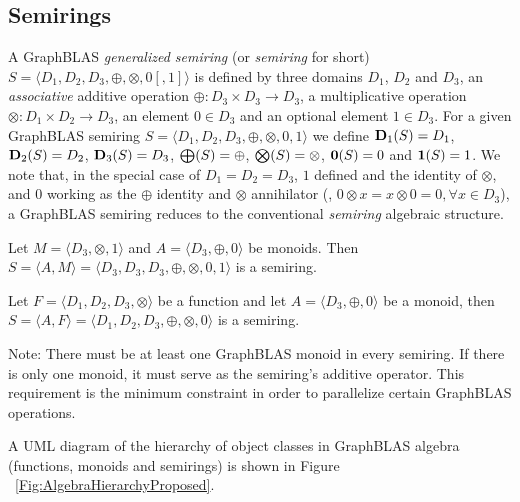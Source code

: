 \documentclass[11pt]{extarticle}
\begin{document}
\subsection{Semirings}

A GraphBLAS \emph{generalized semiring} (or \emph{semiring} for short)
$S=\langle D_1,D_2,D_3,\oplus,\otimes,0 [,1] \rangle$ is defined by
three domains $D_1$, $D_2$ and $D_3$, an \emph{associative} additive operation $\oplus :
D_3 \times D_3 \rightarrow D_3$, 
a multiplicative operation $\otimes : D_1 \times D_2 \rightarrow
D_3$, an element $0 \in D_3$ and an optional element $1 \in D_3$.
For a given GraphBLAS semiring $S=\langle D_1,
D_2, D_3,\oplus,\otimes,0,1 \rangle$ we define $\bold{D}_1(S) = D_1$,
$\bold{D}_2(S) = D_2$, $\bold{D}_3(S) = D_3$, $\bold{\bigoplus}(S) =
\oplus$, $\bold{\bigotimes}(S) = \otimes$, ${\bf 0}(S) = 0$ and ${\bf 1}(S) =
1$. We note that, in the special case of $D_1 = D_2 = D_3$, $1$ defined and the identity of $\otimes$,
and $0$ working as the $\oplus$ identity and $\otimes$ annihilator (\ie, $0 \otimes x = x
\otimes 0 = 0, \forall x \in D_3$), a GraphBLAS semiring reduces to the
conventional \emph{semiring} algebraic structure.

Let $M = \langle D_3, \otimes,1 \rangle$ and $A = \langle D_3,\oplus,0 \rangle$ be monoids.
Then $S= \langle A,M \rangle = \langle D_3,D_3,D_3,\oplus,\otimes,0,1 \rangle$
is a semiring.

Let $F = \langle D_1,D_2,D_3,\otimes \rangle$ be a function
and let $A = \langle D_3,\oplus,0 \rangle$ be a monoid,
then $S= \langle A,F \rangle = \langle D_1,D_2,D_3,\oplus,\otimes,0 \rangle$
is a semiring.

Note: There must be at least one GraphBLAS monoid in every semiring. If there is only one monoid, it must serve as the semiring's additive operator. This requirement is the minimum constraint in order to parallelize certain GraphBLAS operations.

A UML diagram of the hierarchy of object classes in GraphBLAS
algebra (functions, monoids and semirings) is shown in 
Figure ~\ref{Fig:AlgebraHierarchyProposed}.
\end{document}
